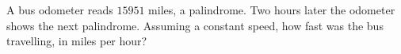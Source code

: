 A bus odometer reads $15951$ miles, a palindrome. Two hours later the odometer shows the next palindrome. Assuming a constant speed, how fast was the bus travelling, in miles per hour?
